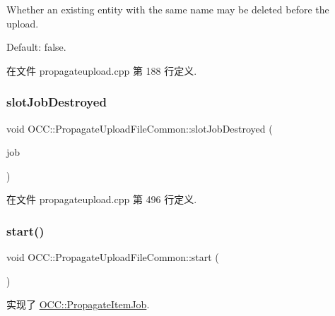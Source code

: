 Whether an existing entity with the same name may be deleted before the upload.

Default\+: false. 

在文件 propagateupload.\+cpp 第 188 行定义.

\mbox{\label{class_o_c_c_1_1_propagate_upload_file_common_a7f4708c023e93387f7815624fd3d9cdd}} 
\subsubsection{\texorpdfstring{slot\+Job\+Destroyed}{slotJobDestroyed}}
{\footnotesize\ttfamily void O\+C\+C\+::\+Propagate\+Upload\+File\+Common\+::slot\+Job\+Destroyed (\begin{DoxyParamCaption}\item[{Q\+Object $\ast$}]{job }\end{DoxyParamCaption})\hspace{0.3cm}{\ttfamily [slot]}}



在文件 propagateupload.\+cpp 第 496 行定义.

\mbox{\label{class_o_c_c_1_1_propagate_upload_file_common_a588514bbae3f7655a7b9dba85fb6af62}} 
\subsubsection{\texorpdfstring{start()}{start()}}
{\footnotesize\ttfamily void O\+C\+C\+::\+Propagate\+Upload\+File\+Common\+::start (\begin{DoxyParamCaption}{ }\end{DoxyParamCaption})\hspace{0.3cm}{\ttfamily [virtual]}}



实现了 \hyperlink{class_o_c_c_1_1_propagate_item_job_a97e7a37e51ad1696f6590dd52080f10a}{O\+C\+C\+::\+Propagate\+Item\+Job}.



